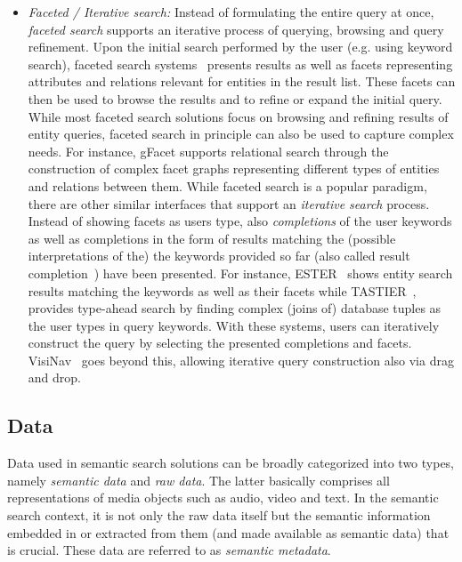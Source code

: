 \begin{itemize}
	\item \emph{Faceted / Iterative search:} Instead of formulating the entire query at once, \emph{faceted search} supports an iterative process of querying, browsing and query refinement. Upon the initial search performed by the user (e.g. using keyword search), faceted search systems~\cite{DBLP:conf/dexa/WagnerLT11,DBLP:conf/semweb/FerreH11,DBLP:conf/esws/HeimEZ10} presents results as well as facets representing attributes and relations relevant for entities in the result list. These facets can then be used to browse the results and to refine or expand the initial query. While most faceted search solutions focus on browsing and refining results of entity queries, faceted search in principle can also be used to capture complex needs. For instance, gFacet\cite{DBLP:conf/esws/HeimEZ10} supports relational search through the construction of complex facet graphs representing different types of entities and relations between them. While faceted search is a popular paradigm, there are other similar interfaces that support an \emph{iterative search} process. Instead of showing facets as users type, also \emph{completions} of the user keywords as well as completions in the form of results matching the (possible interpretations of the) the keywords provided so far (also called result completion~\cite{DBLP:conf/esws/TranMH10}) have been presented. For instance, ESTER~\cite{DBLP:conf/sigir/BastCSW07} shows entity search results matching the keywords as well as their facets while TASTIER~\cite{DBLP:conf/sigmod/LiJLF09}, provides type-ahead search by finding complex (joins of) database tuples as the user types in query keywords. With these systems, users can iteratively construct the query by selecting the presented completions and facets. VisiNav~\cite{DBLP:journals/ws/Harth10} goes beyond this, allowing iterative query construction also via drag and drop. 	
	
	 \end{itemize}

\subsection{Data}
Data used in semantic search solutions can be broadly categorized into two types, namely \emph{semantic data} and \emph{raw data}. The latter basically comprises all representations of media objects such as audio, video and text. In the semantic search context, it is not only the raw data itself but the semantic information embedded in or extracted from them (and made available as semantic data) that is crucial. These data are referred to as \emph{semantic metadata}.   

